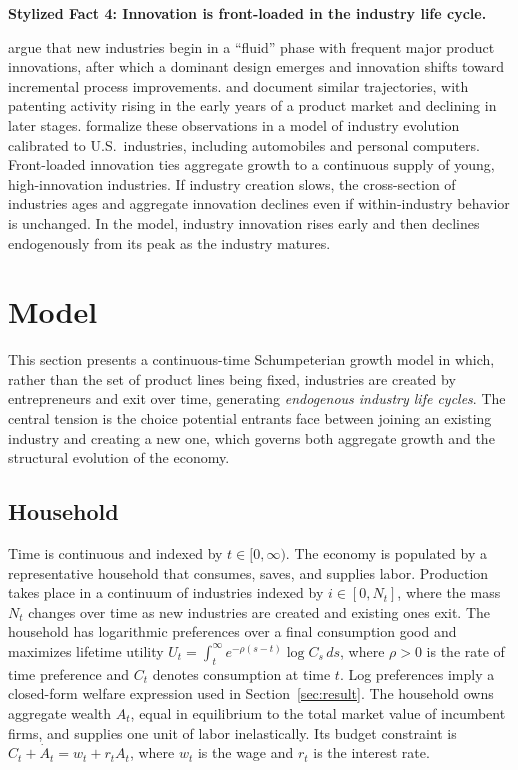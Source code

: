 \documentclass[12pt]{article}
\begin{document}
\medskip
\noindent\textbf{Stylized Fact 4: Innovation is front-loaded in the industry life cycle.}

\citet{AbernathyU78} argue that new industries begin in a ``fluid'' phase with frequent major product innovations, after which a dominant design emerges and innovation shifts toward incremental process improvements. \citet{Klepper96} and \citet{Agarwal98} document similar trajectories, with patenting activity rising in the early years of a product market and declining in later stages. \citet{JovanovicW25} formalize these observations in a model of industry evolution calibrated to U.S.\ industries, including automobiles and personal computers. Front-loaded innovation ties aggregate growth to a continuous supply of young, high-innovation industries. If industry creation slows, the cross-section of industries ages and aggregate innovation declines even if within-industry behavior is unchanged. In the model, industry innovation rises early and then declines endogenously from its peak as the industry matures.

\section{Model}\label{sec:model}
This section presents a continuous-time Schumpeterian growth model in which, rather than the set of product lines being fixed, industries are created by entrepreneurs and exit over time, generating \emph{endogenous industry life cycles}. The central tension is the choice potential entrants face between joining an existing industry and creating a new one, which governs both aggregate growth and the structural evolution of the economy.

\subsection{Household}\label{subsubsec:pref}
Time is continuous and indexed by \(t \in [0, \infty)\). The economy is populated by a representative household that consumes, saves, and supplies labor. Production takes place in a continuum of industries indexed by \(i \in [0, N_t]\), where the mass \(N_t\) changes over time as new industries are created and existing ones exit. The household has logarithmic preferences over a final consumption good and maximizes lifetime utility \(U_t=\int_t^{\infty}e^{-\rho(s-t)}\log C_s\,ds\), where \(\rho>0\) is the rate of time preference and \(C_t\) denotes consumption at time \(t\). Log preferences imply a closed-form welfare expression used in Section~\ref{sec:result}. The household owns aggregate wealth \(A_t\), equal in equilibrium to the total market value of incumbent firms, and supplies one unit of labor inelastically. Its budget constraint is \(C_t+\dot A_t = w_t+r_tA_t\), where \(w_t\) is the wage and \(r_t\) is the interest rate.
\end{document}
